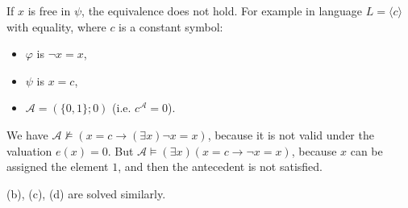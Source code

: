 \begin{problem}
\begin{solution}
            If $x$ is free in $\psi$, the equivalence does not hold. For example in language $L=\langle c\rangle$ with equality, where $c$ is a constant symbol:
            \begin{itemize}
                \item $\varphi$ is $\neg x=x$,
                \item $\psi$ is $x=c$,
                \item $\mathcal A=(\{0,1\};0)$ (i.e. $c^\mathcal A=0$).
            \end{itemize}
            We have $\mathcal A\not\models (x=c\to (\exists x) \neg x=x)$, because it is not valid under the valuation $e(x)=0$. But $\mathcal A\models(\exists x)(x=c\to \neg x=x)$, because $x$ can be assigned the element $1$, and then the antecedent is not satisfied.

        (b), (c), (d) are solved similarly. 
                    
    \end{solution}

\end{problem}


